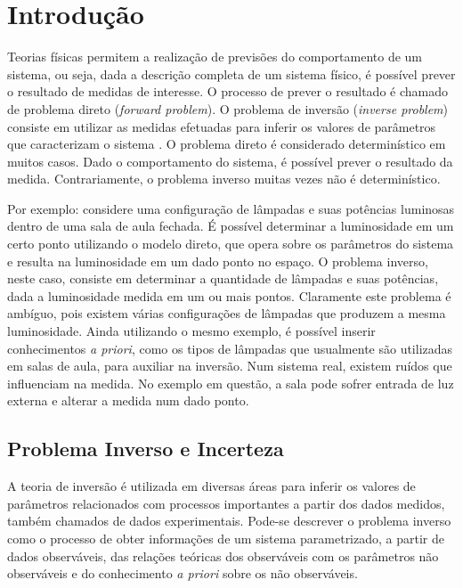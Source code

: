 \chapter{Introdução}
\label{cap:1intro}

Teorias físicas permitem a realização de previsões do comportamento de um
sistema, ou seja, dada a descrição completa de um sistema físico, é possível
prever o resultado de medidas de interesse. O processo de prever o resultado é
chamado de problema direto (\textit{forward problem}). O problema de inversão
(\textit{inverse problem}) consiste em utilizar as medidas efetuadas para
inferir os valores de parâmetros que caracterizam o sistema \citep{tarantola}. O
problema direto é considerado determinístico em muitos casos. Dado o
comportamento do sistema, é possível prever o resultado da medida.
Contrariamente, o problema inverso muitas vezes não é determinístico.

Por exemplo: considere uma configuração de lâmpadas e suas potências luminosas
dentro de uma sala de aula fechada. É possível determinar a luminosidade em um
certo ponto utilizando o modelo direto, que opera sobre os parâmetros do sistema
e resulta na luminosidade em um dado ponto no espaço. O problema inverso, neste
caso, consiste em determinar a quantidade de lâmpadas e suas potências, dada a
luminosidade medida em um ou mais pontos. Claramente este problema é ambíguo,
pois existem várias configurações de lâmpadas que produzem a mesma luminosidade.
Ainda utilizando o mesmo exemplo, é possível inserir conhecimentos
\textit{a priori}, como os tipos de lâmpadas que usualmente são utilizadas em
salas de aula, para auxiliar na inversão. Num sistema real, existem ruídos que influenciam na
medida. No exemplo em questão, a sala pode sofrer entrada de luz externa e
alterar a medida num dado ponto.

\section{Problema Inverso e Incerteza}

A teoria de inversão é utilizada em diversas áreas para inferir os valores de
parâmetros relacionados com processos importantes a partir dos dados medidos,
também chamados de dados experimentais. Pode-se descrever o problema inverso
como o processo de obter informações de um sistema parametrizado, a partir de
dados observáveis, das relações teóricas dos observáveis com os parâmetros não
observáveis e do conhecimento \textit{a priori} sobre os não observáveis.

